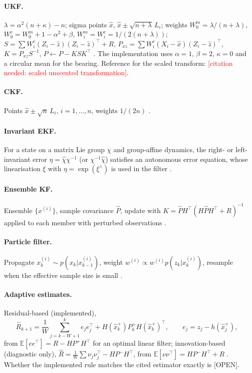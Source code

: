 \documentclass[11pt,a4paper]{article}
\newcommand{\todo}[1]{\textcolor{red}{[#1]}}
\newcommand{\openlbl}{\textsc{[OPEN]}}
\newcommand{\tp}{^{\top}}
\newcommand{\Ex}{\mathbb{E}}
\begin{document}
\paragraph{UKF.} $\lambda=\alpha^2(n+\kappa)-n$; sigma points $\hat x$, $\hat x\pm\sqrt{n+\lambda}\,L_i$;
weights $W^m_0=\lambda/(n+\lambda)$, $W^c_0=W^m_0+1-\alpha^2+\beta$, $W^m_i=W^c_i=1/(2(n+\lambda))$;
$S=\sum W^c_i(Z_i-\hat z)(Z_i-\hat z)\tp+R$, $P_{xz}=\sum W^c_i(X_i-\hat x)(Z_i-\hat z)\tp$,
$K=P_{xz}S^{-1}$, $P\leftarrow P-KSK\tp$ \citep{julier2004}. The implementation uses $\alpha=1$,
$\beta=2$, $\kappa=0$ and a circular mean for the bearing. Reference for the scaled transform:
\todo{citation needed: scaled unscented transformation}.

\paragraph{CKF.} Points $\hat x\pm\sqrt n\,L_i$, $i=1,\dots,n$, weights $1/(2n)$
\citep{arasaratnam2009}.

\paragraph{Invariant EKF.} For a state on a matrix Lie group $\chi$ and group-affine dynamics, the
right- or left-invariant error $\eta=\hat\chi\chi^{-1}$ (or $\chi^{-1}\hat\chi$) satisfies an
autonomous error equation, whose linearisation $\xi$ with $\eta=\exp(\xi^\wedge)$ is used in the
filter \citep{barrau2017}.

\paragraph{Ensemble KF.} Ensemble $\{x^{(i)}\}$, sample covariance $\hat P$, update with
$K=\hat PH\tp(H\hat PH\tp+R)^{-1}$ applied to each member with perturbed observations
\citep{evensen1994}.

\paragraph{Particle filter.} Propagate $x^{(i)}_k\sim p(x_k|x^{(i)}_{k-1})$, weight
$w^{(i)}\propto w^{(i)}p(z_k|x^{(i)}_k)$, resample when the effective sample size is small
\citep{gordon1993}.

\paragraph{Adaptive estimates.} Residual-based (implemented),
\begin{equation}\label{eq:adaptive}
\hat R_{k+1}=\frac1W\sum_{j=k-W+1}^{k}e_je_j\tp+H(\hat x^+_k)P^+_kH(\hat x^+_k)\tp,\qquad e_j=z_j-h(\hat x^+_j),
\end{equation}
from $\Ex[ee\tp]=R-HP^+H\tp$ for an optimal linear filter; innovation-based (diagnostic only),
$\hat R=\frac1W\sum\nu_j\nu_j\tp-HP^-H\tp$, from $\Ex[\nu\nu\tp]=HP^-H\tp+R$
\citep{mehra1970,mohamed1999}. Whether the implemented rule matches the cited estimator exactly is
\openlbl.
\end{document}
